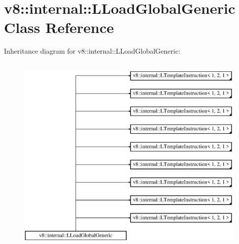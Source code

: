 \hypertarget{classv8_1_1internal_1_1_l_load_global_generic}{}\section{v8\+:\+:internal\+:\+:L\+Load\+Global\+Generic Class Reference}
\label{classv8_1_1internal_1_1_l_load_global_generic}
Inheritance diagram for v8\+:\+:internal\+:\+:L\+Load\+Global\+Generic\+:\begin{figure}[H]
\begin{center}
\leavevmode
\includegraphics[height=10.000000cm]{classv8_1_1internal_1_1_l_load_global_generic}
\end{center}
\end{figure}
